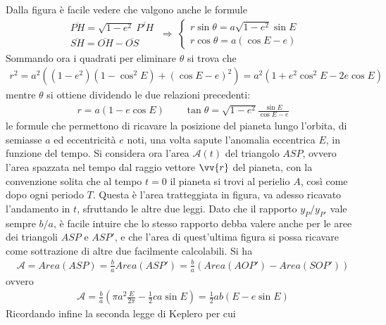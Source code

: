 \documentclass[a4paper, oneside]{book}
\begin{document}
Dalla figura è facile vedere che valgono anche le formule
\begin{gather*}
    \begin{array}{l}
        \overline{PH} = \sqrt{1 - e^{2}} \ \overline{P'H} \\
        \overline{SH} = \overline{OH} - \overline{OS}   
    \end{array} \ \Longrightarrow \ \left\{\begin{array}{l}
        r\sin\theta = a\sqrt{1 - e^{2}} \sin E \\
        r\cos\theta = a(\cos E - e) 
    \end{array}\right.
\end{gather*}
Sommando ora i quadrati per eliminare $\theta$ si trova che
\begin{gather*}
    r^{2} = a^{2}\left((1 - e^{2}) (1 - \cos^{2}E) + (\cos E - e)^{2}\right) = a^{2} \left(1 + e^{2} \cos^{2}E - 2e\cos E\right)
\end{gather*}
mentre $\theta$ si ottiene dividendo le due relazioni precedenti:
\begin{gather*}
    \boxed{r = a(1 - e \cos E) \qquad \tan\theta = \sqrt{1 - e^{2}} \frac{\sin E}{\cos E - e}} 
\end{gather*}
le formule che permettono di ricavare la posizione del pianeta lungo 
l'orbita, di semiasse $a$ ed eccentricità $e$ noti, una volta sapute l'anomalia 
eccentrica $E$, in funzione del tempo. Si considera ora l'area
$\mathcal{A}(t)$ del triangolo $ASP$, ovvero l'area spazzata nel tempo 
dal raggio vettore $\vv{r}$ del pianeta, con la convenzione solita che al tempo $t =0$ il pianeta 
si trovi al perielio $A$, così come dopo ogni periodo $T$. Questa 
è l'area tratteggiata in figura, va adesso ricavato l'andamento 
in $t$, sfruttando le altre due leggi. Dato che il rapporto $y_P/y_{P'}$ vale sempre 
$b/a$, è facile intuire che lo stesso rapporto debba valere anche per le aree
dei triangoli $ASP$ e $ASP'$, e che l'area di quest'ultima figura 
si possa ricavare come sottrazione di altre due facilmente calcolabili. Si ha 
\begin{gather*}
    \mathcal{A} = Area(ASP) = \frac{b}{a} Area (ASP') = \frac{b}{a} (Area(AOP') - Area (SOP'))
\end{gather*} 
ovvero 
\begin{gather*}
    \mathcal{A} = \frac{b}{a} \left(\pi a^{2} \frac{E}{2\pi} - \frac{1}{2}ca\sin E\right) = \frac{1}{2}ab(E - e\sin E)
\end{gather*}
Ricordando infine la seconda legge di Keplero per cui 
\end{document}
